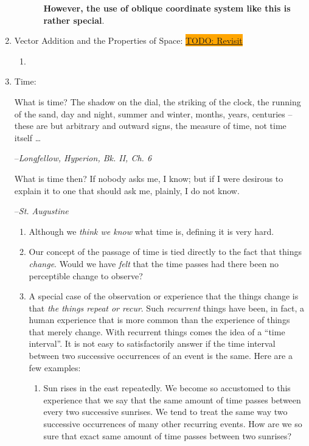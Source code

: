 \documentclass[12pt,a4paper]{book}
\newcommand\TODO[1]{\colorbox{orange}{\underline{\tiny{TODO: #1}}}}
\begin{document}
\begin{enumerate}
\begin{enumerate}
\begin{enumerate}
                        \textbf{However, the use of oblique coordinate system like this is rather special}.
                \end{enumerate}
        \end{enumerate}
    \item Vector Addition and the Properties of Space:
        \TODO{Revisit}
        \begin{enumerate}
            \item 
        \end{enumerate}
    \item Time:
                \epigraph
                {
                    What is time? The shadow on the dial, the striking of the clock, the running of the sand, day and night, summer and winter, months, years, centuries -- these are but arbitrary and outward signs, the measure of time, not time itself \dots
                }
                {
                    --\textit{Longfellow, Hyperion, Bk. II, Ch. 6}
                }
                \epigraph
                {
                    What is time then? If nobody asks me, I know; but if I were desirous to explain it to one that should ask me, plainly, I do not know.
                }
                {
                    --\textit{St. Augustine}
                }
        \begin{enumerate}
            \item Although we \emph{think we know} what time is, defining it is very hard.
            \item Our concept of the passage of time is tied directly to the fact that things \emph{change}. Would we have \emph{felt} that the time passes had there been no perceptible change to observe?
            \item A special case of the observation or experience that the things change is that \emph{the things repeat or recur}. Such \emph{recurrent} things have been, in fact, a human experience that is more common than the experience of things that merely change. With recurrent things comes the idea of a ``time interval''. It is not easy to satisfactorily answer if the time interval between two successive occurrences of an event is the same. Here are a few examples:
                \begin{enumerate}
                    \item Sun rises in the east repeatedly. We become so accustomed to this experience that we say that the same amount of time passes between every two successive sunrises. We tend to treat the same way two successive occurrences of many other recurring events. How are we so sure that exact same amount of time passes between two sunrises?  

\end{enumerate}
\end{enumerate}
\end{enumerate}
\end{document}
